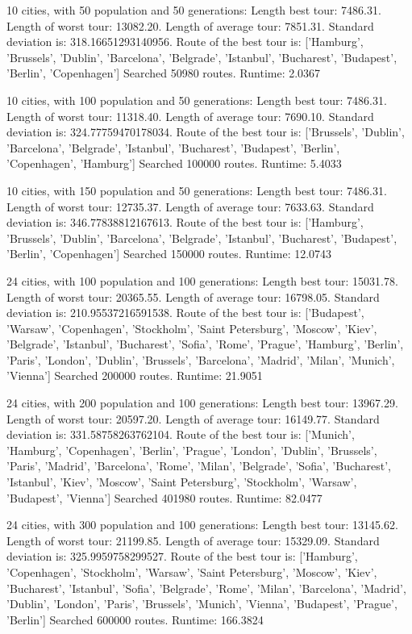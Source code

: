 10 cities, with 50 population and 50 generations:
 Length best tour: 7486.31.
 Length of worst tour: 13082.20.
 Length of average tour: 7851.31.
 Standard deviation is: 318.16651293140956.
 Route of the best tour is: ['Hamburg', 'Brussels', 'Dublin', 'Barcelona', 'Belgrade', 'Istanbul', 'Bucharest', 'Budapest', 'Berlin', 'Copenhagen']
 Searched 50980 routes.
 Runtime: 2.0367


10 cities, with 100 population and 50 generations:
 Length best tour: 7486.31.
 Length of worst tour: 11318.40.
 Length of average tour: 7690.10.
 Standard deviation is: 324.77759470178034.
 Route of the best tour is: ['Brussels', 'Dublin', 'Barcelona', 'Belgrade', 'Istanbul', 'Bucharest', 'Budapest', 'Berlin', 'Copenhagen', 'Hamburg']
 Searched 100000 routes.
 Runtime: 5.4033


10 cities, with 150 population and 50 generations:
 Length best tour: 7486.31.
 Length of worst tour: 12735.37.
 Length of average tour: 7633.63.
 Standard deviation is: 346.77838812167613.
 Route of the best tour is: ['Hamburg', 'Brussels', 'Dublin', 'Barcelona', 'Belgrade', 'Istanbul', 'Bucharest', 'Budapest', 'Berlin', 'Copenhagen']
 Searched 150000 routes.
 Runtime: 12.0743



 24 cities, with 100 population and 100 generations:
 Length best tour: 15031.78.
 Length of worst tour: 20365.55.
 Length of average tour: 16798.05.
 Standard deviation is: 210.95537216591538.
 Route of the best tour is: ['Budapest', 'Warsaw', 'Copenhagen', 'Stockholm', 'Saint Petersburg', 'Moscow', 'Kiev', 'Belgrade', 'Istanbul', 'Bucharest', 'Sofia', 'Rome', 'Prague', 'Hamburg', 'Berlin', 'Paris', 'London', 'Dublin', 'Brussels', 'Barcelona', 'Madrid', 'Milan', 'Munich', 'Vienna']
 Searched 200000 routes.
 Runtime: 21.9051


24 cities, with 200 population and 100 generations:
 Length best tour: 13967.29.
 Length of worst tour: 20597.20.
 Length of average tour: 16149.77.
 Standard deviation is: 331.58758263762104.
 Route of the best tour is: ['Munich', 'Hamburg', 'Copenhagen', 'Berlin', 'Prague', 'London', 'Dublin', 'Brussels', 'Paris', 'Madrid', 'Barcelona', 'Rome', 'Milan', 'Belgrade', 'Sofia', 'Bucharest', 'Istanbul', 'Kiev', 'Moscow', 'Saint Petersburg', 'Stockholm', 'Warsaw', 'Budapest', 'Vienna']
 Searched 401980 routes.
 Runtime: 82.0477


24 cities, with 300 population and 100 generations:
 Length best tour: 13145.62.
 Length of worst tour: 21199.85.
 Length of average tour: 15329.09.
 Standard deviation is: 325.9959758299527.
 Route of the best tour is: ['Hamburg', 'Copenhagen', 'Stockholm', 'Warsaw', 'Saint Petersburg', 'Moscow', 'Kiev', 'Bucharest', 'Istanbul', 'Sofia', 'Belgrade', 'Rome', 'Milan', 'Barcelona', 'Madrid', 'Dublin', 'London', 'Paris', 'Brussels', 'Munich', 'Vienna', 'Budapest', 'Prague', 'Berlin']
 Searched 600000 routes.
 Runtime: 166.3824
